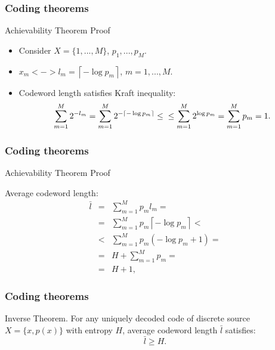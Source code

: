 \documentclass[14pt]{beamer}
\begin{document}
\begin{frame}
\frametitle{Coding theorems}
Achievability Theorem Proof
\begin{itemize}    
    
    \item Consider  $X = \{1,...,M\}$, $p_1 ,...,p_M $. 
    \item $x_m <-> l_m = \left\lceil { - \log p_m } \right\rceil $, $m = 1,...,M.$ 
   
    \item Codeword length satisfies Kraft inequality:
    \[
    \sum\limits_{m = 1}^M {2^{ - l_m }} = \sum\limits_{m = 1}^M {2^{ - \left\lceil { - \log p_m } \right\rceil }} \le \\
    \le \sum\limits_{m = 1}^M {2^{\log p_m }} = \sum\limits_{m = 1}^M {p_m = 1} .
    \]

\end{itemize}
\end{frame}


\begin{frame}
\frametitle{Coding theorems}
Achievability Theorem Proof
\begin{itemize}    
\small{

    \item Average codeword length:
    \begin{eqnarray*}
    \bar {l} &=& \sum\limits_{m = 1}^M {p_m l_m }=\\
    &=& \sum_{m = 1}^M p_m \left\lceil  - \log p_m  \right \rceil < \\
    &<& \sum_{m = 1}^M p_m \left(  - \log p_m + 1 \right) = \\
    &=& H + \sum\limits_{m = 1}^M p_m =\\
    &=& H + 1 ,
    \end{eqnarray*}
}
\end{itemize}
\end{frame}


\begin{frame}
\frametitle{Coding theorems}  

\begin{theorem}{Inverse Theorem.} For any uniquely decoded code of discrete source $X = \{x,p(x)\}$ with entropy $H$, average codeword length $\bar {l}$ satisfies:
\begin{equation}
\label{Inv_Th} \bar {l} \ge H.
\end{equation}
\end{theorem}
    
\end{frame}
\end{document}
